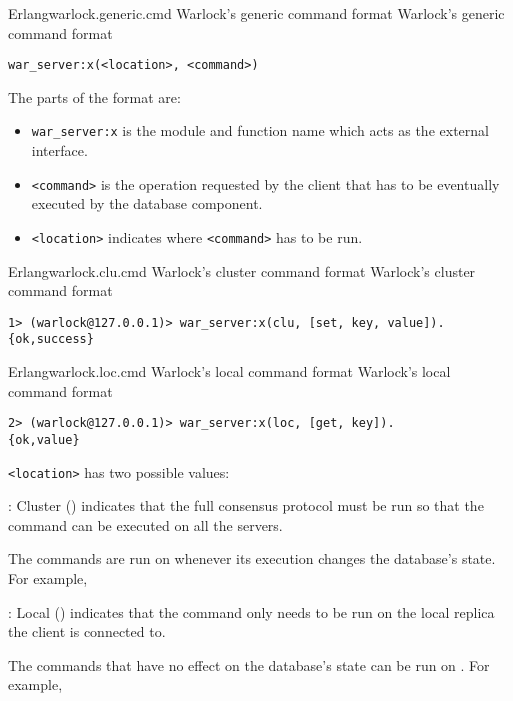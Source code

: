 \begin{scode}{Erlang}{warlock.generic.cmd}{%
  Warlock's generic command format}{%
  Warlock's generic command format}
  \begin{lstlisting}
war_server:x(<location>, <command>)
  \end{lstlisting}
\end{scode}

The parts of the format are:

\begin{itemize}
  \item \texttt{war\_server:x} is the module and function name which acts
    as the external interface.
  \item \texttt{<command>} is the operation requested by the client that has to
    be eventually executed by the database component.
  \item \texttt{<location>} indicates where \texttt{<command>} has to be
    run.
\end{itemize}

\begin{scode}{Erlang}{warlock.clu.cmd}{%
  Warlock's cluster command format}{%
  Warlock's cluster command format}
  \begin{lstlisting}
1> (warlock@127.0.0.1)> war_server:x(clu, [set, key, value]).
{ok,success}
  \end{lstlisting}
\end{scode}


\begin{scode}{Erlang}{warlock.loc.cmd}{%
  Warlock's local command format}{%
  Warlock's local command format}
  \begin{lstlisting}
2> (warlock@127.0.0.1)> war_server:x(loc, [get, key]).
{ok,value}
  \end{lstlisting}
\end{scode}

\texttt{<location>} has two possible values:

\begin{itemize}
    : Cluster () indicates that the full
    consensus protocol must be run so that the command can be executed
    on all the servers.

    The commands are run on  whenever its execution changes
    the database's state. For example, 

    : Local () indicates that the command only
    needs to be run on the local replica the client is connected to.

    The commands that have no effect on the database's state can be run
    on . For example, 
\end{itemize}

